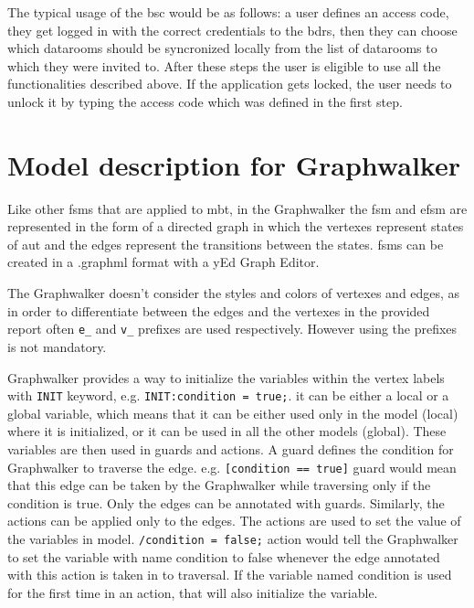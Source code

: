 \par
The typical usage of the \acrshort{bsc} would be as follows: a user defines an access code, they get logged in with the correct credentials to the \acrshort{bdrs}, then they can choose which datarooms should be syncronized locally from the list of datarooms to which they were invited to. After these steps the user is eligible to use all the functionalities described above. If the application gets locked, the user needs to unlock it by typing the access code which was defined in the first step.

\section{Model description for Graphwalker}
\par
Like other \acrshort{fsm}s that are applied to \acrshort{mbt}, in the Graphwalker the \acrshort{fsm} and \acrshort{efsm} are represented in the form of a directed graph in which the vertexes represent states of \acrshort{aut} and the edges represent the transitions between the states. \acrshort{fsm}s can be created in a .graphml format with a yEd Graph Editor.

\par
The Graphwalker doesn't consider the styles and colors of vertexes and edges, as in order to differentiate between the edges and the vertexes in the provided report often \texttt{e\_} and \texttt{v\_} prefixes are used respectively. However using the prefixes is not mandatory.

\par
Graphwalker provides a way to initialize the variables within the vertex labels with \texttt{INIT} keyword, e.g. \texttt{INIT:condition = true;}. it can be either a local or a global variable, which means that it can be either used only in the model (local) where it is initialized, or it can be used in all the other models (global). These variables are then used in guards and actions. A guard defines the condition for Graphwalker to traverse the edge. e.g. \texttt{[condition == true]} guard would mean that this edge can be taken by the Graphwalker while traversing only if the condition is true. Only the edges can be annotated with guards. Similarly, the actions can be applied only to the edges. The actions are used to set the value of the variables in model. \texttt{/condition = false;} action would tell the Graphwalker to set the variable with name condition to false whenever the edge annotated with this action is taken in to traversal. If the  variable named condition is used for the first time in an action, that will also initialize the variable. 

